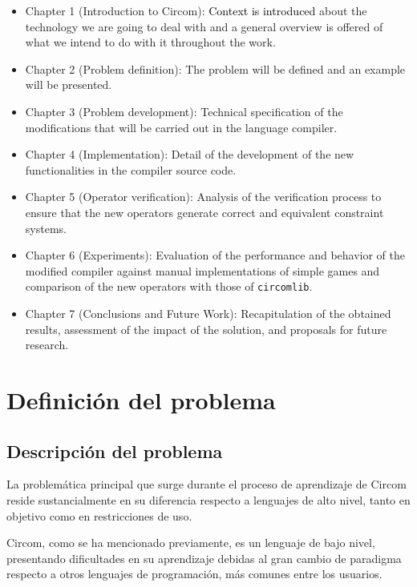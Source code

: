 \documentclass[a4paper,12pt]{report}
\begin{document}
	\begin{itemize}
		\item Chapter 1 (Introduction to Circom): \textcolor{black}{Context is introduced} about the technology we are going to deal with and a general overview is offered of what we intend to do with it throughout the work.
		\item Chapter 2 (Problem definition): The problem will be defined and an example will be presented.
		\item Chapter 3 (Problem development): Technical specification of the modifications that will be carried out in the language compiler.
		\item Chapter 4 (Implementation): Detail of the development of the new functionalities in the compiler source code.
		\item Chapter 5 (Operator verification): Analysis of the verification process to ensure that the new operators generate correct and equivalent constraint systems.
		\item Chapter 6 (Experiments): Evaluation of the performance and behavior of the modified compiler against manual implementations of simple games and comparison of the new operators with those of \texttt{circomlib}.
		\item Chapter 7 (Conclusions and Future Work): Recapitulation of the obtained results, assessment of the impact of the solution, and proposals for future research.
	\end{itemize}
	
	
	\chapter{Definición del problema}
	
	\noindent 
	
	\section{Descripción del problema}
	\vspace{0.2cm}
	\noindent La problemática principal que surge durante el proceso de aprendizaje de Circom reside sustancialmente en su diferencia respecto a lenguajes de alto nivel, tanto en objetivo como en restricciones de uso.
	
	
	\vspace{0.2cm}
	\noindent Circom, como se ha mencionado previamente, es un lenguaje de bajo nivel, presentando dificultades en su aprendizaje debidas al gran cambio de paradigma respecto a otros lenguajes de programación, más comunes entre los usuarios.
	
\end{document}
